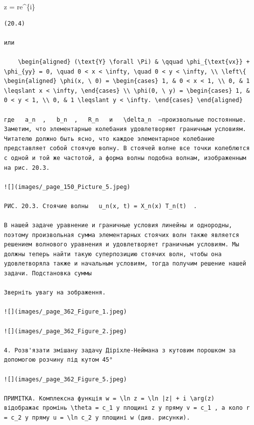 \documentclass[
  ukrainian,
]{article}
\begin{document}
z = re\^{}\{i\theta\}

\begin{verbatim}
(20.4)

или

    \begin{aligned} (\text{Y} \forall \Pi) & \qquad \phi_{\text{vx}} + \phi_{yy} = 0, \quad 0 < x < \infty, \quad 0 < y < \infty, \\ \left\{ \begin{aligned} \phi(x, \ 0) = \begin{cases} 1, & 0 < x < 1, \\ 0, & 1 \leqslant x < \infty, \end{cases} \\ \phi(0, \ y) = \begin{cases} 1, & 0 < y < 1, \\ 0, & 1 \leqslant y < \infty. \end{cases} \end{aligned}

где   a_n  ,   b_n  ,   R_n   и   \delta_n  —произвольные постоянные. Заметим, что элементарные колебания удовлетворяют граничным условиям. Читателю должно быть ясно, что каждое элементарное колебание представляет собой стоячую волну. В стоячей волне все точки колеблются с одной и той же частотой, а форма волны подобна волнам, изображенным на рис. 20.3.

![](images/_page_150_Picture_5.jpeg)

РИС. 20.3. Стоячие волны   u_n(x, t) = X_n(x) T_n(t)  .

В нашей задаче уравнение и граничные условия линейны и однородны, поэтому произвольная сумма элементарных стоячих волн также является решением волнового уравнения и удовлетворяет граничным условиям. Мы должны теперь найти такую суперпозицию стоячих волн, чтобы она удовлетворяла также и начальным условиям, тогда получим решение нашей задачи. Подстановка суммы

Зверніть увагу на зображення.

![](images/_page_362_Figure_1.jpeg)

![](images/_page_362_Figure_2.jpeg)

4. Розв'язати змішану задачу Діріхле-Неймана з кутовим порошком за допомогою розчину під кутом 45°

![](images/_page_362_Figure_5.jpeg)

ПРИМІТКА. Комплексна функція w = \ln z = \ln |z| + i \arg(z) відображає промінь \theta = c_1 у площині z у пряму v = c_1 , а коло r = c_2 у пряму u = \ln c_2 у площині w (див. рисунки).


\end{verbatim}
\end{document}
